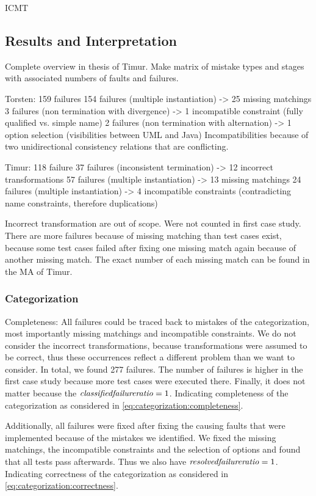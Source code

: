\begin{copiedFrom}{ICMT}
\subsection{Results and Interpretation}

Complete overview in thesis of Timur.
Make matrix of mistake types and stages with associated numbers of faults and failures.



Torsten: 159 failures
154 failures (multiple instantiation) -> 25 missing matchings
3 failures (non termination with divergence) -> 1 incompatible constraint (fully qualified vs. simple name)
2 failures (non termination with alternation) -> 1 option selection (visibilities between UML and Java)
Incompatibilities because of two unidirectional consistency relations that are conflicting.


Timur: 118 failure
37 failures (inconsistent termination) -> 12 incorrect transformations
57 failures (multiple instantiation) -> 13 missing matchings
24 failures (multiple instantiation) -> 4 incompatible constraints (contradicting name constraints, therefore duplications)

Incorrect transformation are out of scope. Were not counted in first case study.
There are more failures because of missing matching than test cases exist, because some test cases failed after fixing one missing match again because of another missing match.
The exact number of each missing match can be found in the MA of Timur.


\subsubsection{Categorization}

Completeness: All failures could be traced back to mistakes of the categorization, most importantly missing matchings and incompatible constraints.
We do not consider the incorrect transformations, because transformations were assumed to be correct, thus these occurrences reflect a different problem than we want to consider.
In total, we found 277 failures. The number of failures is higher in the first case study because more test cases were executed there.
Finally, it does not matter because the $\mathit{classified failure ratio} = 1$.
Indicating completeness of the categorization as considered in \autoref{eq:categorization:completeness}.

Additionally, all failures were fixed after fixing the causing faults that were implemented because of the mistakes we identified.
We fixed the missing matchings, the incompatible constraints and the selection of options and found that all tests pass afterwards.
Thus we also have $\mathit{resolved failure ratio} = 1$.
Indicating correctness of the categorization as considered in \autoref{eq:categorization:correctness}.


\end{copiedFrom}
